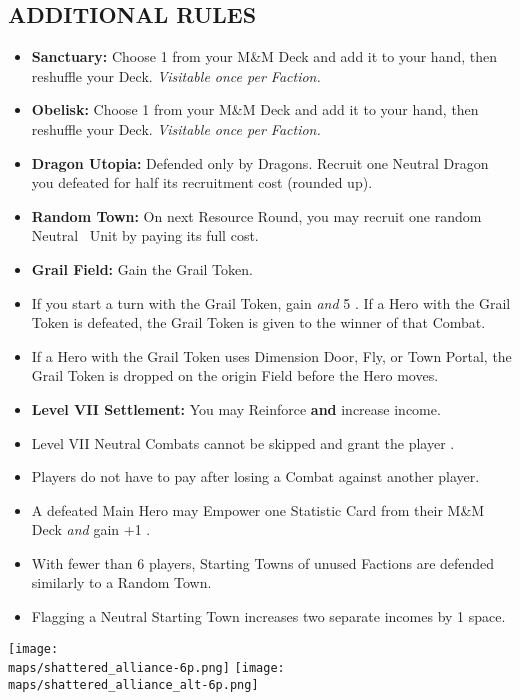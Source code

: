 \begin{multicols*}{2}
\subsection*{\MakeUppercase{Additional Rules}}
\begin{itemize}
  \item \textbf{Sanctuary:} Choose 1  from your M\&M Deck and add it to your hand, then reshuffle your Deck. \textit{Visitable once per Faction.}
  \item \textbf{Obelisk:} Choose 1  from your M\&M Deck and add it to your hand, then reshuffle your Deck. \textit{Visitable once per Faction.}
  \item \textbf{Dragon Utopia:} Defended only by Dragons. Recruit one Neutral Dragon you defeated for half its recruitment cost (rounded up).
  \item \textbf{Random Town:} On next Resource Round, you may recruit one random Neutral \silver\ Unit by paying its full  cost.
  \item \textbf{Grail Field:} Gain the Grail Token.
  \item If you start a turn with the Grail Token, gain  \textit{and} 5 . If a Hero with the Grail Token is defeated, the Grail Token is given to the winner of that Combat.
  \item If a Hero with the Grail Token uses Dimension Door, Fly, or Town Portal, the Grail Token is dropped on the origin Field before the Hero moves.
  \item \textbf{Level VII Settlement:} You may Reinforce \textbf{and} increase income.
  \item Level VII Neutral Combats cannot be skipped and grant the player .
  \item Players do not have to pay  after losing a Combat against another player.
  \item A defeated Main Hero may Empower one Statistic Card from their M\&M Deck \textit{and} gain +1 .
  \item With fewer than 6 players, Starting Towns of unused Factions are defended similarly to a Random Town.
  \item Flagging a Neutral Starting Town increases two separate incomes by 1 space.
\end{itemize}

\begin{center}
  \vspace*{\fill}
  \texttt{[image: \\maps/shattered\_alliance-6p.png]}
  \vspace*{\fill}
  \texttt{[image: \\maps/shattered\_alliance\_alt-6p.png]}
  \vspace*{\fill}
\end{center}

\end{multicols*}
